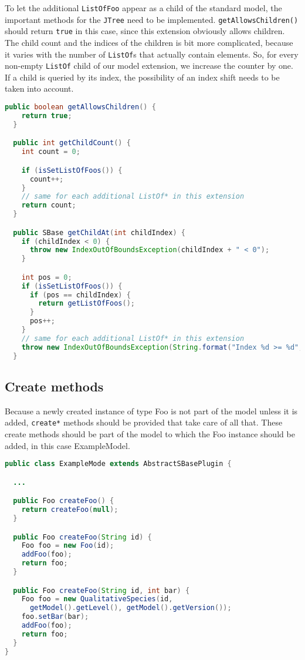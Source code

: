 To let the additional \texttt{ListOfFoo} appear as a child of the standard model, the important methods for the \texttt{JTree} need to be implemented.
\texttt{getAllowsChildren()} should return \texttt{true} in this case, since this extension obviously allows children.
The child count and the indices of the children is bit more complicated, because it varies with the number of \texttt{ListOf}s that actually contain elements.
So, for every non-empty \texttt{ListOf} child of our model extension, we increase the counter by one.
If a child is queried by its index, the possibility of an index shift needs to be taken into account.

\begin{lstlisting}[language=Java,caption={Methods which need to be implemented to make the children available in the extended model},label={lst:ModelExtChildren}]
  public boolean getAllowsChildren() {
    return true;
  }

  public int getChildCount() {
    int count = 0;

    if (isSetListOfFoos()) {
      count++;
    }
    // same for each additional ListOf* in this extension
    return count;
  }

  public SBase getChildAt(int childIndex) {
    if (childIndex < 0) {
      throw new IndexOutOfBoundsException(childIndex + " < 0");
    }

    int pos = 0;
    if (isSetListOfFoos()) {
      if (pos == childIndex) {
        return getListOfFoos();
      }
      pos++;
    }
    // same for each additional ListOf* in this extension
    throw new IndexOutOfBoundsException(String.format("Index %d >= %d", childIndex, +((int) Math.min(pos, 0))));
  }
\end{lstlisting}



\subsection{Create methods}

Because a newly created instance of type Foo is not part of the model unless it is added,
\texttt{create*} methods should be provided that take care of all that.
These create methods should be part of the model to which the Foo instance should be added, in this case ExampleModel.

\begin{lstlisting}[language=Java,caption={Convenience method to retrieve the extended model},label={lst:ModelExtCreateMethods}]
public class ExampleMode extends AbstractSBasePlugin {

  ...

  public Foo createFoo() {
    return createFoo(null);
  }

  public Foo createFoo(String id) {
    Foo foo = new Foo(id);
    addFoo(foo);
    return foo;
  }

  public Foo createFoo(String id, int bar) {
    Foo foo = new QualitativeSpecies(id,
      getModel().getLevel(), getModel().getVersion());
    foo.setBar(bar);
    addFoo(foo);
    return foo;
  }
}
\end{lstlisting}


